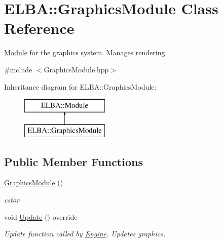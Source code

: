 \hypertarget{class_e_l_b_a_1_1_graphics_module}{}\section{E\+L\+BA\+:\+:Graphics\+Module Class Reference}
\label{class_e_l_b_a_1_1_graphics_module}


\mbox{\hyperlink{class_e_l_b_a_1_1_module}{Module}} for the graphics system. Manages rendering.  




{\ttfamily \#include $<$Graphics\+Module.\+hpp$>$}

Inheritance diagram for E\+L\+BA\+:\+:Graphics\+Module\+:\begin{figure}[H]
\begin{center}
\leavevmode
\includegraphics[height=2.000000cm]{class_e_l_b_a_1_1_graphics_module}
\end{center}
\end{figure}
\subsection*{Public Member Functions}
\begin{DoxyCompactItemize}
\item 
\mbox{\label{class_e_l_b_a_1_1_graphics_module_ab9a67cab79cbdbd2b53c51955d6f137c}} 
\mbox{\hyperlink{class_e_l_b_a_1_1_graphics_module_ab9a67cab79cbdbd2b53c51955d6f137c}{Graphics\+Module}} ()
\begin{DoxyCompactList}\small\item\em cstor \end{DoxyCompactList}\item 
\mbox{\label{class_e_l_b_a_1_1_graphics_module_a610a0dcdef572635b06de3a8a01d3375}} 
void \mbox{\hyperlink{class_e_l_b_a_1_1_graphics_module_a610a0dcdef572635b06de3a8a01d3375}{Update}} () override
\begin{DoxyCompactList}\small\item\em Update function called by \mbox{\hyperlink{class_e_l_b_a_1_1_engine}{Engine}}. Updates graphics. \end{DoxyCompactList}\end{DoxyCompactItemize}


